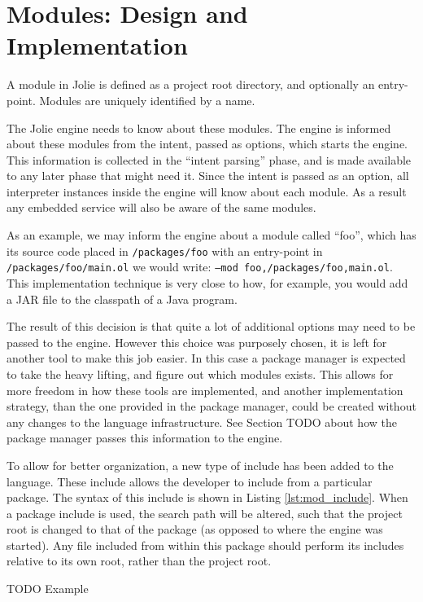 \section{Modules: Design and Implementation}

A module in Jolie is defined as a project root directory, and optionally an
entry-point. Modules are uniquely identified by a name.

The Jolie engine needs to know about these modules. The engine is informed
about these modules from the intent, passed as options, which starts the
engine. This information is collected in the ``intent parsing'' phase, and is
made available to any later phase that might need it.  Since the intent is
passed as an option, all interpreter instances inside the engine will know
about each module.  As a result any embedded service will also be aware of the
same modules.

As an example, we may inform the engine about a module called ``foo'', which
has its source code placed in \verb!/packages/foo!  with an entry-point in
\verb!/packages/foo/main.ol! we would write: \texttt{--mod
foo,/packages/foo,main.ol}. This implementation technique is very close to
how, for example, you would add a JAR file to the classpath of a Java program.

The result of this decision is that quite a lot of additional options may need
to be passed to the engine. However this choice was purposely chosen, it is
left for another tool to make this job easier. In this case a package manager
is expected to take the heavy lifting, and figure out which modules exists.
This allows for more freedom in how these tools are implemented, and another
implementation strategy, than the one provided in the package manager, could be
created without any changes to the language infrastructure. See Section TODO
about how the package manager passes this information to the engine.

To allow for better organization, a new type of include has been added to the
language. These include allows the developer to include from a particular
package. The syntax of this include is shown in Listing \ref{lst:mod_include}.
When a package include is used, the search path will be altered, such that the
project root is changed to that of the package (as opposed to where the engine
was started). Any file included from within this package should perform its
includes relative to its own root, rather than the project root.

TODO Example

